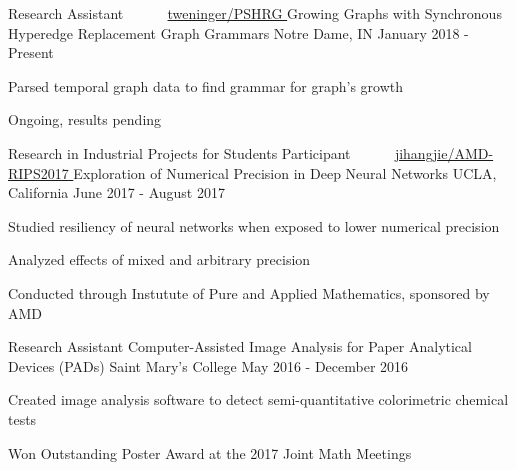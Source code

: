 \begin{cventries}
  \cventry
  {Research Assistant ~~~~~
     \href{https://github.com/tweninger/PSHRG}{tweninger/PSHRG
     \faGithubSquare}}
  {Growing Graphs with Synchronous Hyperedge Replacement Graph Grammars}
  {Notre Dame, IN}
  {January 2018 - Present}
  {
    \begin{cvitems}
      \item Parsed temporal graph data to find grammar for graph's growth
      \item Ongoing, results pending
    \end{cvitems}
  }
  \cventry
  {Research in Industrial Projects for Students Participant ~~~~~
   \href{https://github.com/jihangjie/AMD-RIPS2017}{jihangjie/AMD-RIPS2017 \faGithubSquare
}}
  {Exploration of Numerical Precision in Deep Neural Networks}
  {UCLA, California}
  {June 2017 - August 2017}
  {
    \begin{cvitems}
      \item Studied resiliency of neural networks when exposed to lower numerical precision
      \item Analyzed effects of mixed and arbitrary precision
      \item Conducted through Instutute of Pure and Applied Mathematics, sponsored by AMD
    \end{cvitems}
  }
  \cventry
    {Research Assistant}
    {Computer-Assisted Image Analysis for Paper Analytical Devices (PADs)}
    {Saint Mary's College}
    {May 2016 - December 2016}
    {
      \begin{cvitems}
        \item {Created image analysis software to detect semi-quantitative colorimetric chemical tests}
        \item {Won Outstanding Poster Award at the 2017 Joint Math Meetings}
      \end{cvitems}
     }
\end{cventries}
    

